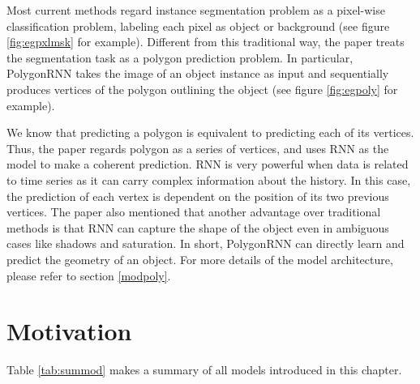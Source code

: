 Most current methods regard instance segmentation problem as a pixel-wise classification problem, labeling each pixel as object or background (see figure \ref{fig:egpxlmsk} for example). Different from this traditional way, the paper treats the segmentation task as a polygon prediction problem. In particular, PolygonRNN takes the image of an object instance as input and sequentially produces vertices of the polygon outlining the object (see figure \ref{fig:egpoly} for example).



We know that predicting a polygon is equivalent to predicting each of its vertices. Thus, the paper regards polygon as a series of vertices, and uses RNN as the model to make a coherent prediction. RNN is very powerful when data is related to time series as it can carry complex information about the history. In this case, the prediction of each vertex is dependent on the position of its two previous vertices. The paper also mentioned that another advantage over traditional methods is that RNN can capture the shape of the object even in ambiguous cases like shadows and saturation. In short, PolygonRNN can directly learn and predict the geometry of an object. For more details of the model architecture, please refer to section \ref{modpoly}.

\section{Motivation}\label{motivation}
Table \ref{tab:summod} makes a summary of all models introduced in this chapter.

